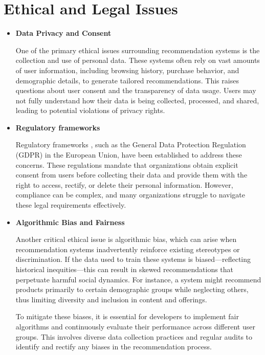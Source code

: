 \documentclass[10pt,twoside,slovak,a4paper]{article}
\begin{document}
\section{Ethical and Legal Issues} \label{Ethical and Legal Issues}
\begin{itemize}



\item \textbf{Data Privacy and Consent} 

One of the primary ethical issues surrounding recommendation systems is the collection and use of personal data\cite{problems}. These systems often rely on vast amounts of user information, including browsing history, purchase behavior, and demographic details, to generate tailored recommendations. This raises questions about user consent and the transparency of data usage. Users may not fully understand how their data is being collected, processed, and shared, leading to potential violations of privacy rights.

\item \textbf{Regulatory frameworks}

Regulatory frameworks , such as the General Data Protection Regulation (GDPR) in the European Union, have been established to address these concerns. These regulations mandate that organizations obtain explicit consent from users before collecting their data and provide them with the right to access, rectify, or delete their personal information\cite{ethical}. However, compliance can be complex, and many organizations struggle to navigate these legal requirements effectively.


\item \textbf{Algorithmic Bias and Fairness} 

Another critical ethical issue is algorithmic bias\cite{problems}, which can arise when recommendation systems inadvertently reinforce existing stereotypes or discrimination. If the data used to train these systems is biased—reflecting historical inequities—this can result in skewed recommendations that perpetuate harmful social dynamics. For instance, a system might recommend products primarily to certain demographic groups while neglecting others, thus limiting diversity and inclusion in content and offerings.

To mitigate these biases, it is essential for developers to implement fair algorithms and continuously evaluate their performance across different user groups. This involves diverse data collection practices and regular audits to identify and rectify any biases in the recommendation process.


\end{itemize}
\end{document}

